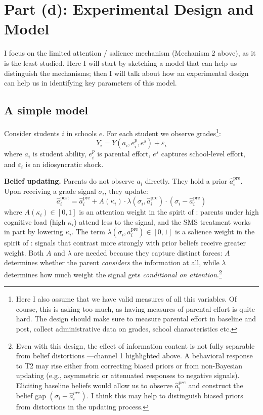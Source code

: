 \documentclass[11pt]{article}
\begin{document}
\section{Part (d): Experimental Design and Model}

I focus on the limited attention / salience mechanism (Mechanism 2 above), as it is the least studied. Here I will start by sketching a model that can help us distinguish the mechanisms; then I will talk about how an experimental design can help us in identifying key parameters of this model. 

\subsection{A simple model}

Consider students $i$ in schools $e$. For each student we observe grades\footnote{Here I also assume that we have valid measures of all this variables. Of course, this is asking too much, as having measures of parental effort is quite hard. The design should make sure to measure parental effort in baseline and post, collect administrative data on grades, school characteristics etc.}:
\[
Y_{i} = Y(a_{i}, e_{i}^{p}, e^{s}) + \varepsilon_{i}
\]
where $a_i$ is student ability, $e_i^p$ is parental effort, $e^s$ captures school-level effort, 
and $\varepsilon_i$ is an idiosyncratic shock.

\medskip
\noindent \textbf{Belief updating.} Parents do not observe $a_i$ directly. They hold a prior 
$\hat{a}_{i}^{\text{pre}}$. Upon receiving a grade signal $\sigma_i$, they update:
\[
\hat{a}_{i}^{\text{post}} = \hat{a}_{i}^{\text{pre}} 
  + A(\kappa_i) \cdot \lambda(\sigma_i, \hat{a}_{i}^{\text{pre}}) 
  \cdot (\sigma_i - \hat{a}_{i}^{\text{pre}})
\]
where $A(\kappa_i) \in [0,1]$ is an attention weight in the spirit of \citet{gabaix2014sparsity}: 
parents under high cognitive load (high $\kappa_i$) attend less to the signal, and the 
SMS treatment works in part by lowering $\kappa_i$. The term $\lambda(\sigma_i, 
\hat{a}_{i}^{\text{pre}}) \in [0,1]$ is a salience weight in the spirit of \citet{bordalo2012salience}: signals that contrast more strongly with prior beliefs 
receive greater weight. Both $A$ and $\lambda$ are needed because they capture distinct 
forces: $A$ determines whether the parent \emph{considers} the information at all, 
while $\lambda$ determines how much weight the signal gets \emph{conditional on attention}.\footnote{Even with this design, the effect of information content is not fully separable from belief distortions ---channel 1 highlighted above. A behavioral response to T2 may rise either from correcting biased priors or from non-Bayesian updating (e.g., asymmetric or attenuated responses to negative signals). Eliciting baseline beliefs would allow us to observe $\hat a_i^{pre}$ and construct the belief gap $(\sigma_i - \hat a_i^{pre})$. I think this may help to distinguish biased priors from distortions in the updating process.
}
\end{document}
